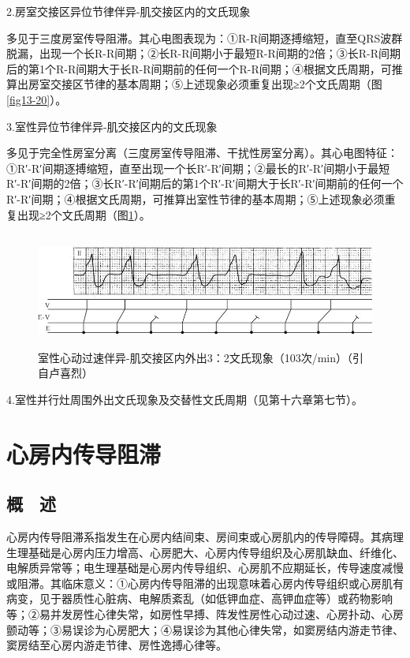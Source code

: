 2.房室交接区异位节律伴异-肌交接区内的文氏现象

多见于三度房室传导阻滞。其心电图表现为：①R-R间期逐搏缩短，直至QRS波群脱漏，出现一个长R-R间期；②长R-R间期小于最短R-R间期的2倍；③长R-R间期后的第1个R-R间期大于长R-R间期前的任何一个R-R间期；④根据文氏周期，可推算出房室交接区节律的基本周期；⑤上述现象必须重复出现≥2个文氏周期（图\ref{fig13-20}）。

3.室性异位节律伴异-肌交接区内的文氏现象

多见于完全性房室分离（三度房室传导阻滞、干扰性房室分离）。其心电图特征：①R′-R′间期逐搏缩短，直至出现一个长R′-R′间期；②最长的R′-R′间期小于最短R′-R′间期的2倍；③长R′-R′间期后的第1个R′-R′间期大于长R′-R′间期前的任何一个R′-R′间期；④根据文氏周期，可推算出室性节律的基本周期；⑤上述现象必须重复出现≥2个文氏周期（图\ref{fig18-15}）。

\begin{figure}[!htbp]
 \centering
 \includegraphics[width=5.64583in,height=1.48958in]{./images/Image00316.jpg}
 \captionsetup{justification=centering}
 \caption{室性心动过速伴异-肌交接区内外出3：2文氏现象（103次/min）（引自卢喜烈）}
 \label{fig18-15}
  \end{figure} 

4.室性并行灶周围外出文氏现象及交替性文氏周期（见第十六章第七节）。

\protect\hypertarget{text00026.html}{}{}

\protect\hypertarget{text00026.htmlux5cux23chapter26}{}{}

\chapter{心房内传导阻滞}

\protect\hypertarget{text00026.htmlux5cux23subid313}{}{}

\section{概　述}

心房内传导阻滞系指发生在心房内结间束、房间束或心房肌内的传导障碍。其病理生理基础是心房内压力增高、心房肥大、心房内传导组织及心房肌缺血、纤维化、电解质异常等；电生理基础是心房内传导组织、心房肌不应期延长，传导速度减慢或阻滞。其临床意义：①心房内传导阻滞的出现意味着心房内传导组织或心房肌有病变，见于器质性心脏病、电解质紊乱（如低钾血症、高钾血症等）或药物影响等；②易并发房性心律失常，如房性早搏、阵发性房性心动过速、心房扑动、心房颤动等；③易误诊为心房肥大；④易误诊为其他心律失常，如窦房结内游走节律、窦房结至心房内游走节律、房性逸搏心律等。

